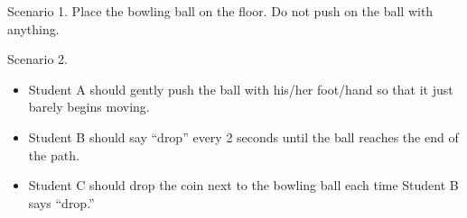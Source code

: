 \documentclass[../main-physics-problems.tex]{subfiles}
\begin{document}
\begin{questions}
\question
Scenario 1. Place the bowling ball on the floor. Do not push on the ball with anything.


\question
Scenario 2.

\begin{itemize}[itemsep=0pt,topsep=0pt]
    \item Student A should gently push the ball with his/her foot/hand so that it just barely begins moving.
    \item Student B should say ``drop'' every 2 seconds until the ball reaches the end of the path.
    \item Student C should drop the coin next to the bowling ball each time Student B says ``drop.''
\end{itemize}

\medskip



\end{questions}
\end{document}
